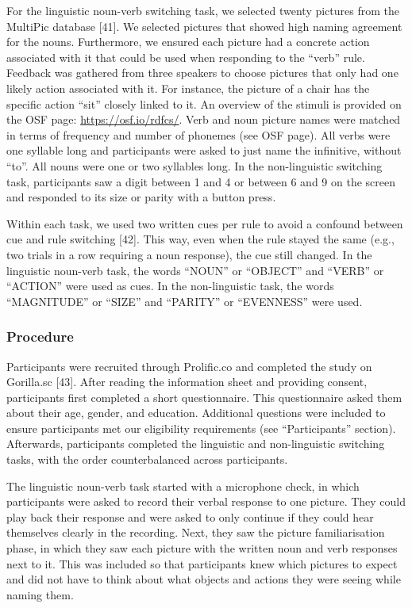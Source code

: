\documentclass[
]{article}
\begin{document}
For the linguistic noun-verb switching task, we selected twenty pictures from the MultiPic database {[}41{]}. We selected pictures that showed high naming agreement for the nouns. Furthermore, we ensured each picture had a concrete action associated with it that could be used when responding to the ``verb'' rule. Feedback was gathered from three speakers to choose pictures that only had one likely action associated with it. For instance, the picture of a chair has the specific action ``sit'' closely linked to it. An overview of the stimuli is provided on the OSF page: \url{https://osf.io/rdfcs/}. Verb and noun picture names were matched in terms of frequency and number of phonemes (see OSF page). All verbs were one syllable long and participants were asked to just name the infinitive, without ``to''. All nouns were one or two syllables long. In the non-linguistic switching task, participants saw a digit between 1 and 4 or between 6 and 9 on the screen and responded to its size or parity with a button press.

Within each task, we used two written cues per rule to avoid a confound between cue and rule switching {[}42{]}. This way, even when the rule stayed the same (e.g., two trials in a row requiring a noun response), the cue still changed. In the linguistic noun-verb task, the words ``NOUN'' or ``OBJECT'' and ``VERB'' or ``ACTION'' were used as cues. In the non-linguistic task, the words ``MAGNITUDE'' or ``SIZE'' and ``PARITY'' or ``EVENNESS'' were used.

\hypertarget{procedure}{%
\subsubsection{Procedure}\label{procedure}}

Participants were recruited through Prolific.co and completed the study on Gorilla.sc {[}43{]}. After reading the information sheet and providing consent, participants first completed a short questionnaire. This questionnaire asked them about their age, gender, and education. Additional questions were included to ensure participants met our eligibility requirements (see ``Participants'' section). Afterwards, participants completed the linguistic and non-linguistic switching tasks, with the order counterbalanced across participants.

The linguistic noun-verb task started with a microphone check, in which participants were asked to record their verbal response to one picture. They could play back their response and were asked to only continue if they could hear themselves clearly in the recording. Next, they saw the picture familiarisation phase, in which they saw each picture with the written noun and verb responses next to it. This was included so that participants knew which pictures to expect and did not have to think about what objects and actions they were seeing while naming them.
\end{document}
